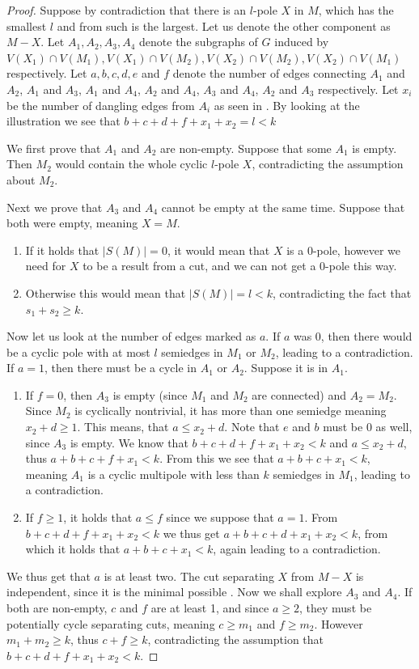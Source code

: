 \documentclass[12pt, twoside]{book}
\begin{document}
\begin{proof}
	Suppose by contradiction that there is an $l$-pole $X$ in $M$, which has the smallest $l$ and from such is the largest. Let us denote the other component as $M-X$. Let $A_1,A_2,A_3,A_4$ denote the subgraphs of $G$ induced by $V(X_1)\cap V(M_1), V(X_1)\cap V(M_2), V(X_2)\cap V(M_2), V(X_2)\cap V(M_1)$ respectively. Let $a,b,c,d,e$ and $f$ denote the number of edges connecting $A_1$ and $A_2$, $A_1$ and $A_3$, $A_1$ and $A_4$, $A_2$ and $A_4$, $A_3$ and $A_4$, $A_2$ and $A_3$ respectively. Let $x_i$ be the number of dangling edges from $A_i$ as seen in . By looking at the illustration we see that $b+c+d+f+x_1+x_2=l<k$
	
	We first prove that $A_1$ and $A_2$ are non-empty. Suppose that some $A_1$ is empty. Then $M_2$ would contain the whole cyclic $l$-pole $X$, contradicting the assumption about $M_2$.
	
	Next we prove that $A_3$ and $A_4$ cannot be empty at the same time. Suppose that both were empty, meaning $X=M$.
	\begin{enumerate}
		\item If it holds that $|S(M)|=0$, it would mean that $X$ is a 0-pole, however we need for $X$ to be a result from a cut, and we can not get a 0-pole this way.
		\item Otherwise this would mean that $|S(M)|=l<k$, contradicting the fact that $s_1+s_2\geq k$.
	\end{enumerate}

	Now let us look at the number of edges marked as $a$. If $a$ was 0, then there would be a cyclic pole with at most $l$ semiedges in $M_1$ or $M_2$, leading to a contradiction. If $a=1$, then there must be a cycle in $A_1$ or $A_2$. Suppose it is in $A_1$.
	\begin{enumerate}
		\item If $f=0$, then $A_3$ is empty (since $M_1$ and $M_2$ are connected) and $A_2=M_2$. Since $M_2$ is cyclically nontrivial, it has more than one semiedge meaning $x_2+d\geq 1$. This means, that $a\leq x_2+d$. Note that $e$ and $b$ must be 0 as well, since $A_3$ is empty. We know that $b+c+d+f+x_1+x_2<k$ and $a\leq x_2+d$, thus $a+b+c+f+x_1<k$. From this we see that $a+b+c+x_1<k$, meaning $A_1$ is a cyclic multipole with less than $k$ semiedges in $M_1$, leading to a contradiction.
		\item If $f\geq 1$, it holds that $a\leq f$ since we suppose that $a=1$. From $b+c+d+f+x_1+x_2<k$ we thus get $a+b+c+d+x_1+x_2<k$, from which it holds that $a+b+c+x_1<k$, again leading to a contradiction.
	\end{enumerate}
	We thus get that $a$ is at least two. The cut separating $X$ from $M-X$ is independent, since it is the minimal possible . Now we shall explore $A_3$ and $A_4$. If both are non-empty, $c$ and $f$ are at least 1, and since $a\geq 2$, they must be potentially cycle separating cuts, meaning $c\geq m_1$ and $f\geq m_2$. However $m_1+m_2\geq k$, thus $c+f\geq k$, contradicting the assumption that $b+c+d+f+x_1+x_2<k$.
	

\end{proof}
\end{document}
